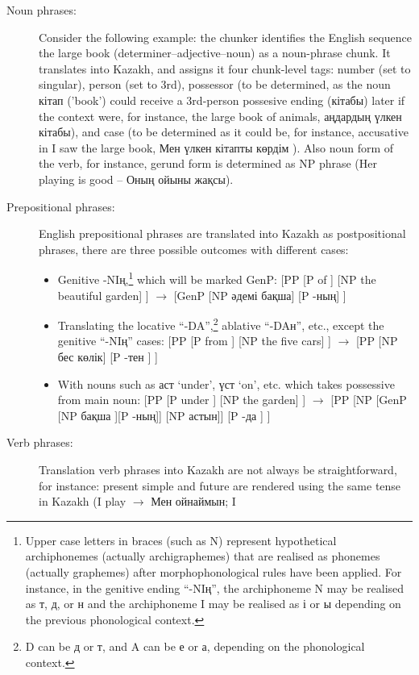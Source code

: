 \documentclass[11pt]{article}
\begin{document}
\begin{description}
\item[Noun phrases:] Consider the following example: the chunker identifies the English sequence 
  the large book  (determiner–adjective–noun) as a noun-phrase chunk. It translates into 
  Kazakh, and assigns it four chunk-level tags: number (set to singular), person (set to 3rd), 
  possessor (to be determined, as the noun кітап ('book') could receive a 3rd-person possesive 
  ending (кітабы) later if the context were, for instance, the large book of animals, аңдардың үлкен кітабы), 
  and case (to be determined as it could be, for instance, accusative in I saw the large book, Мен үлкен кітапты көрдім ). Also 
  noun form of the verb, for instance,  gerund form is determined as NP phrase (Her playing is good – Оның ойыны жақсы).
\item[Prepositional phrases:] English prepositional phrases are translated into Kazakh as postpositional phrases, 
  there are three possible outcomes with different cases:
   \begin{itemize}
    \item Genitive -{N}{I}ң,\footnote{Upper case letters in braces (such as {N}) represent hypothetical archiphonemes (actually archigraphemes) that are realised as phonemes (actually graphemes) after morphophonological rules have been applied. For instance, in the genitive ending “-{N}{I}ң”, the archiphoneme {N} may be realised as т, д, or н and the archiphoneme {I} may be realised as  і  or ы depending on the previous phonological context. } which will be marked GenP:  
        [PP [P of ] [NP the beautiful garden] ] $\rightarrow$ [GenP [NP әдемі бақша] [P -ның] ] 
    \item Translating the locative ``-{D}{A}'',\footnote{{D} can be д or т, and {A} can be е or а, depending on the 
        phonological context.} ablative ``-{D}{A}н'', etc., except the genitive ``-{N}{I}ң'' cases: 
        [PP [P from ] [NP the five cars] ] $\rightarrow$ [PP [NP бес көлік] [P -тен ] ]
    \item With nouns such as аст `under', үст `on', etc. which takes possessive from main noun:  
        [PP [P under ] [NP the garden] ] $\rightarrow$ [PP [NP [GenP [NP бақша ][P -ның]] [NP астын]] [P -да ] ]
    \end{itemize}
\item[Verb phrases:] Translation verb phrases into Kazakh  are not always be straightforward, for instance: 
  present simple and future are rendered using the same tense in Kazakh (I play $\rightarrow$ Мен ойнаймын;  I 

\end{description}
\end{document}
